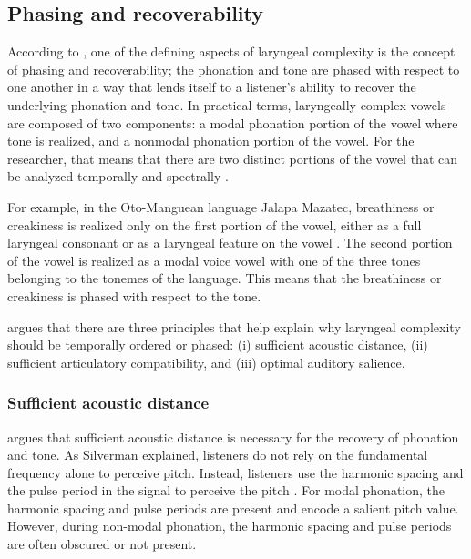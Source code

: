 \subsection{Phasing and recoverability}\label{sec:phasing_and_recoverability}

According to \citet{silvermanLaryngealComplexityOtomanguean1997,silvermanPhasingRecoverability1997}, one of the defining aspects of laryngeal complexity is the concept of phasing and recoverability; the phonation and tone are phased with respect to one another in a way that lends itself to a listener's ability to recover the underlying phonation and tone. In practical terms, laryngeally complex vowels are composed of two components: a modal phonation portion of the vowel where tone is realized, and a nonmodal phonation portion of the vowel. For the researcher, that means that there are two distinct portions of the vowel that can be analyzed temporally and spectrally \citep[237]{silvermanLaryngealComplexityOtomanguean1997}.

For example, in the Oto-Manguean language Jalapa Mazatec, breathiness or creakiness is realized only on the first portion of the vowel, either as a full laryngeal consonant or as a laryngeal feature on the vowel \citep[238]{silvermanLaryngealComplexityOtomanguean1997}. The second portion of the vowel is realized as a modal voice vowel with one of the three tones belonging to the tonemes of the language. This means that the breathiness or creakiness is phased with respect to the tone.

\citeauthor{silvermanLaryngealComplexityOtomanguean1997} argues that there are three principles that help explain why laryngeal complexity should be temporally ordered or phased: (i) sufficient acoustic distance, (ii) sufficient articulatory compatibility, and (iii) optimal auditory salience. 

\subsubsection{Sufficient acoustic distance}\label{sec:sufficient_acoustic_distance}

\citet{silvermanLaryngealComplexityOtomanguean1997} argues that sufficient acoustic distance is necessary for the recovery of phonation and tone. As Silverman explained, listeners do not rely on the fundamental frequency alone to perceive pitch. Instead, listeners use the harmonic spacing and the pulse period in the signal to perceive the pitch \citep{ritsmaFrequenciesDominantPerception1967,remezIntonationSinusoidalSentences1993}. For modal phonation, the harmonic spacing and pulse periods are present and encode a salient pitch value. However, during non-modal phonation, the harmonic spacing and pulse periods are often obscured or not present.

